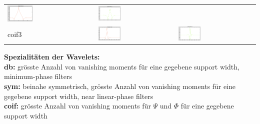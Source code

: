 \begin{center}
\begin{tabular}{l||m{}|m{}}
		\includegraphics[width=0.3\textwidth]{content/Coif1Phi.png} &
		\includegraphics[width=0.3\textwidth]{content/Coif1Psi.png} \\
		coif3 &
		\includegraphics[width=0.3\textwidth]{content/Coif3Phi.png} &
		\includegraphics[width=0.3\textwidth]{content/Coif3Psi.png} \\
	\end{tabular}
\end{center}

\textbf{Spezialitäten der Wavelets:}\\
\textbf{db:} grösste Anzahl von vanishing moments für eine gegebene support width, minimum-phase filters\\
\textbf{sym:} beinahe symmetrisch, grösste Anzahl von vanishing moments für eine gegebene support width, near linear-phase filters\\ 
\textbf{coif:} grösste Anzahl von vanishing moments für $\Psi$ und $\Phi$ für eine gegebene support width\\

